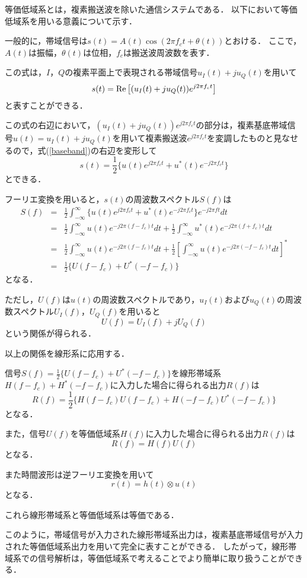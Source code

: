 等価低域系とは，複素搬送波を除いた通信システムである．
以下において等価低域系を用いる意義について示す．\par
一般的に，帯域信号は$s(t)=A(t)\cos{(2\pi f_ct+\theta(t))}$とおける．
ここで，$A(t)$は振幅，$\theta(t)$は位相，$f_c$は搬送波周波数を表す．\par
この式は，$I$，$Q$の複素平面上で表現される帯域信号$u_I(t)+ju_Q(t)$を用いて
\begin{equation}
    s(t)={\rm Re}\left[(u_I(t)+ju_Q(t))e^{j2\pi f_ct}\right]
    \label{baseband}
\end{equation}
と表すことができる．\par
この式の右辺において，$(u_I(t)+ju_Q(t))e^{j2\pi f_ct}$の部分は，複素基底帯域信号$u(t)=u_I(t)+ju_Q(t)$を用いて複素搬送波$e^{j2\pi f_ct}$を変調したものと見なせるので，式(\ref{baseband})の右辺を変形して
\begin{equation}
    s(t)=\frac{1}{2}\{u(t)e^{j2\pi f_ct}+u^*(t)e^{-j2\pi f_ct}\}
\end{equation}
とできる．\par
フーリエ変換を用いると，$s(t)$の周波数スペクトル$S(f)$は
\begin{eqnarray}
    S(f)&=&\frac{1}{2}\int_{-\infty}^{\infty} \{u(t)e^{j2\pi f_ct}+u^*(t)e^{-j2\pi f_ct}\}e^{-j2\pi ft} dt\\
    &=&\frac{1}{2}\int_{-\infty}^{\infty} u(t)e^{-j2\pi(f-f_c)t} dt+\frac{1}{2}\int_{-\infty}^{\infty} u^*(t)e^{-j2\pi(f+f_c)t} dt\\
    &=&\frac{1}{2}\int_{-\infty}^{\infty} u(t)e^{-j2\pi(f-f_c)t} dt+\frac{1}{2}\left[\int_{-\infty}^{\infty} u(t)e^{-j2\pi(-f-f_c)t} dt\right]^*\\
    &=&\frac{1}{2}\{U(f-f_c)+U^*(-f-f_c)\}
\end{eqnarray}
となる．\par
ただし，$U(f)$は$u(t)$の周波数スペクトルであり，$u_I(t)$および$u_Q(t)$の周波数スペクトル$U_I(f)$，$U_Q(f)$を用いると
\begin{equation}
    U(f)=U_I(f)+jU_Q(f)
\end{equation}
という関係が得られる．\par
以上の関係を線形系に応用する．\par
信号$S(f)=\frac{1}{2}\{U(f-f_c)+U^*(-f-f_c)\}$を線形帯域系$H(f-f_c)+H^*(-f-f_c)$に入力した場合に得られる出力$R(f)$は
\begin{equation}
    R(f)=\frac{1}{2}\{H(f-f_c)U(f-f_c)+H(-f-f_c)U^*(-f-f_c)\}
\end{equation}
となる．\par
また，信号$U(f)$を等価低域系$H(f)$に入力した場合に得られる出力$R(f)$は
\begin{equation}
    R(f)=H(f)U(f)
\end{equation}
となる．\par
また時間波形は逆フーリエ変換を用いて
\begin{equation}
    r(t)=h(t)\otimes u(t)
\end{equation}
となる．\par
これら線形帯域系と等価低域系は等価である．\par
このように，帯域信号が入力された線形帯域系出力は，複素基底帯域信号が入力された等価低域系出力を用いて完全に表すことができる．
したがって，線形帯域系での信号解析は，等価低域系で考えることでより簡単に取り扱うことができる．